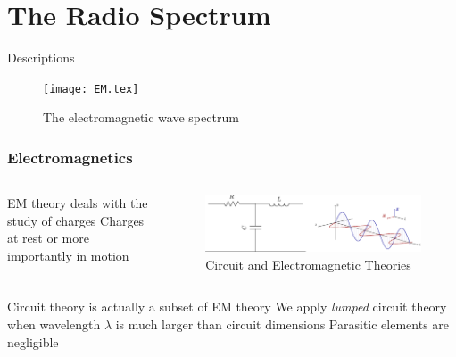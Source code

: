 \documentclass[10pt, compress]{beamer}
\begin{document}
\section{The Radio Spectrum}
\begin{frame}{Descriptions}
  \begin{figure}[t!]
  \centering
        {\texttt{[image: EM.tex]}
        \label{fig:EM}}
        \caption{The electromagnetic wave spectrum}
      \end{figure}
\end{frame}
\begin{frame}
  \frametitle{Electromagnetics}
 \begin{columns}[T] %
  \begin{column}{.4\textwidth}
    \begin{outline}
    \1 EM theory deals with the study of charges
    \1 Charges at rest or more importantly in motion
  \end{outline}
   \end{column}
 \begin{column}[T]{.6\textwidth}
    \begin{figure}
      \centering
          \includegraphics[width=1.0\textwidth]{em_vs_ckt.pdf}
      \caption{Circuit and Electromagnetic Theories}
    \end{figure}
      \end{column}%
\end{columns}
\begin{outline}
  \1 Circuit theory is actually a subset of EM theory
  \1 We apply \textit{lumped} circuit theory when wavelength $\lambda$ is much larger than circuit dimensions
  \2 Parasitic elements are negligible
\end{outline}
\end{frame}
\end{document}
